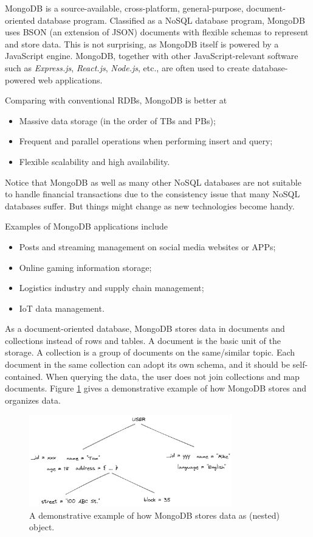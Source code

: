 MongoDB is a source-available, cross-platform, general-purpose, document-oriented database program. Classified as a NoSQL database program, MongoDB uses BSON (an extension of JSON) documents with flexible schemas to represent and store data. This is not surprising, as MongoDB itself is powered by a JavaScript engine. MongoDB, together with other JavaScript-relevant software such as \textit{Express.js}, \textit{React.js}, \textit{Node.js}, etc., are often used to create database-powered web applications.

Comparing with conventional RDBs, MongoDB is better at
\begin{itemize}
	\item Massive data storage (in the order of TBs and PBs);
	\item Frequent and parallel operations when performing insert and query;
	\item Flexible scalability and high availability.
\end{itemize}
Notice that MongoDB as well as many other NoSQL databases are not suitable to handle financial transactions due to the consistency issue that many NoSQL databases suffer. But things might change as new technologies become handy.

Examples of MongoDB applications include
\begin{itemize}
	\item Posts and streaming management on social media websites or APPs;
	\item Online gaming information storage;
	\item Logistics industry and supply chain management;
	\item IoT data management.
\end{itemize}

As a document-oriented database, MongoDB stores data in documents and collections instead of rows and tables. A document is the basic unit of the storage. A collection is a group of documents on the same/similar topic. Each document in the same collection can adopt its own schema, and it should be self-contained. When querying the data, the user does not join collections and map documents. Figure \ref{ch:database:mongotree} gives a demonstrative example of how MongoDB stores and organizes data.
\begin{figure}[htbp]
	\centering
	\includegraphics[width=250pt]{chapters/part-3/figures/mongodb_tree.png}
	\caption{A demonstrative example of how MongoDB stores data as (nested) object.} \label{ch:database:mongotree}
\end{figure}

